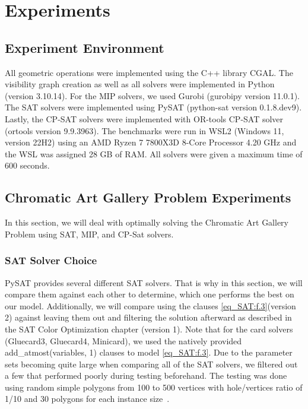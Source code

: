 \chapter{Experiments}
\section{Experiment Environment}
All geometric operations were implemented using the C++ library CGAL. The visibility graph creation as well as all solvers were implemented in Python (version 3.10.14). For the MIP solvers, we used Gurobi (gurobipy version 11.0.1). The SAT solvers were implemented using PySAT (python-sat version 0.1.8.dev9). Lastly, the CP-SAT solvers were implemented with OR-tools CP-SAT solver (ortools version 9.9.3963).
The benchmarks were run in WSL2 (Windows 11, version 22H2) using an AMD Ryzen 7 7800X3D 8-Core Processor 4.20 GHz and the WSL was assigned 28 GB of RAM. All solvers were given a maximum time of 600 seconds.

\section{Chromatic Art Gallery Problem Experiments}
In this section, we will deal with optimally solving the Chromatic Art Gallery Problem using SAT, MIP, and CP-Sat solvers.

\subsection{SAT Solver Choice}
PySAT provides several different SAT solvers. That is why in this section, we will compare them against each other to determine, which one performs the best on our model. Additionally, we will compare using the clauses \cref{eq_SAT:f.3}(version 2) against leaving them out and filtering the solution afterward as described in the SAT Color Optimization chapter (version 1). Note that for the card solvers (Gluecard3, Gluecard4, Minicard), we used the natively provided add\_atmost(variables, 1) clauses to model \cref{eq_SAT:f.3}. Due to the parameter sets becoming quite large when comparing all of the SAT solvers, we filtered out a few that performed poorly during testing beforehand. The testing was done using random simple polygons from 100 to 500 vertices with hole/vertices ratio of 1/10 and 30 polygons for each instance size~\cite{wireless-localization-instances-page}.

